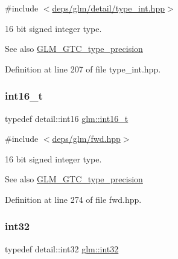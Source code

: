 {\ttfamily \#include $<$\hyperlink{type__int_8hpp}{deps/glm/detail/type\+\_\+int.\+hpp}$>$}

16 bit signed integer type. \begin{DoxySeeAlso}{See also}
\hyperlink{group__gtc__type__precision}{G\+L\+M\+\_\+\+G\+T\+C\+\_\+type\+\_\+precision} 
\end{DoxySeeAlso}


Definition at line 207 of file type\+\_\+int.\+hpp.

\mbox{\label{group__gtc__type__precision_gaf89ee61e0d34aa4a462104b7ae7f2da6}} 
\subsubsection{\texorpdfstring{int16\+\_\+t}{int16\_t}}
{\footnotesize\ttfamily typedef detail\+::int16 \hyperlink{group__gtc__type__precision_gaf89ee61e0d34aa4a462104b7ae7f2da6}{glm\+::int16\+\_\+t}}



{\ttfamily \#include $<$\hyperlink{fwd_8hpp}{deps/glm/fwd.\+hpp}$>$}

16 bit signed integer type. \begin{DoxySeeAlso}{See also}
\hyperlink{group__gtc__type__precision}{G\+L\+M\+\_\+\+G\+T\+C\+\_\+type\+\_\+precision} 
\end{DoxySeeAlso}


Definition at line 274 of file fwd.\+hpp.

\mbox{\label{group__gtc__type__precision_ga632d8b25f6b61659f39ea4321fab92a4}} 
\subsubsection{\texorpdfstring{int32}{int32}}
{\footnotesize\ttfamily typedef detail\+::int32 \hyperlink{group__gtc__type__precision_ga632d8b25f6b61659f39ea4321fab92a4}{glm\+::int32}}



